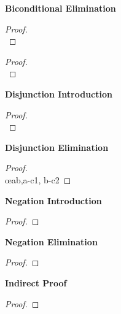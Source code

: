 \begin{multicols}{2}
\vspace{1em}\noindent\textbf{Biconditional Elimination}
\begin{proof}
\\	
	 
\end{proof}

\end{multicols}

\newpage
\begin{multicols}{2}
\begin{proof}
\\	
	 
\end{proof}


\vspace{1em}\noindent\textbf{Disjunction Introduction}

\begin{proof}

\\	
\end{proof}

\vspace{1em}\noindent\textbf{Disjunction Elimination}

\begin{proof}
\\	\open
	\close
	\open
	\close
	 \oe{ab,a-c1, b-c2}
\end{proof}

\vspace{1em}\noindent\textbf{Negation Introduction}

\begin{proof}
	\open
	\close
\end{proof}


\vspace{1em}\noindent\textbf{Negation Elimination}

\begin{proof}
\end{proof}

\vspace{1em}\noindent\textbf{Indirect Proof}

\begin{proof}
	\open
	\close
\end{proof}

\end{multicols}

